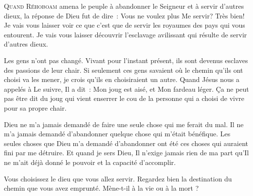 \dvrule







\lettrine{Q}{uand Réhoboam} amena le peuple à abandonner le Seigneur
 et à servir d'autres dieux, la réponse de Dieu fut de dire~:
 \og Vous ne voulez plus Me servir? Très bien!
 Je vais vous laisser voir ce que c'est que de servir les royaumes
 des pays qui vous entourent. Je vais vous laisser découvrir l'esclavage
 avilissant qui résulte de servir d'autres dieux. \fg{}


Les gens n'ont pas changé. Vivant pour l'instant présent, ils sont devenus
 esclaves des passions de leur chair. Si seulement ces gens savaient
 où le chemin qu'ils ont choisi va les mener, je crois qu'ils en choisiraient
 un autre. Quand Jésus nous a appelés à Le suivre, Il a dit~:
 \og Mon joug est aisé, et Mon fardeau léger. \fg{}
 Ça ne peut pas être dit du joug qui vient enserrer le cou de la personne
 qui a choisi de vivre pour sa propre chair. 

Dieu ne m'a jamais demandé de faire une seule chose qui me ferait du mal.
 Il ne m'a jamais demandé d'abandonner quelque chose qui m'était bénéfique.
 Les seules choses que Dieu m'a demandé d'abandonner ont été ces choses
 qui auraient fini par me détruire. Et quand je sers Dieu,
 Il n'exige jamais rien de ma part qu'Il ne m'ait déjà donné le pouvoir
 et la capacité d'accomplir. 

Vous choisissez le dieu que vous allez servir. Regardez bien la destination
 du chemin que vous avez emprunté. Mène-t-il à la vie ou à la mort ? 

\dvrule




